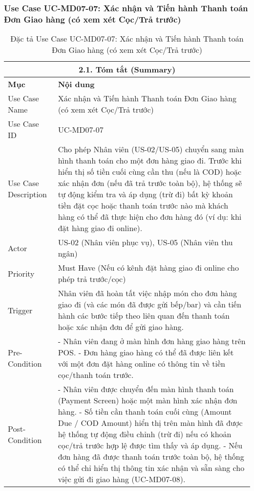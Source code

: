 \subsubsection{Use Case UC-MD07-07: Xác nhận và Tiến hành Thanh toán Đơn Giao hàng (có xem xét Cọc/Trả trước)}
\begin{longtable}{|m{4cm}|p{11cm}|}
\caption{Đặc tả Use Case UC-MD07-07: Xác nhận và Tiến hành Thanh toán Đơn Giao hàng (có xem xét Cọc/Trả trước)} \label{tab:uc_md07_07_final_full} \\
\hline
\multicolumn{2}{|c|}{\textbf{2.1. Tóm tắt (Summary)}} \\
\hline
\textbf{Mục} & \textbf{Nội dung} \\
\hline
\endhead %
\hline
\endfoot %
\hline
\endlastfoot %
Use Case Name & Xác nhận và Tiến hành Thanh toán Đơn Giao hàng (có xem xét Cọc/Trả trước) \\
\hline
Use Case ID & UC-MD07-07 \\
\hline
Use Case Description & Cho phép Nhân viên (US-02/US-05) chuyển sang màn hình thanh toán cho một đơn hàng giao đi. Trước khi hiển thị số tiền cuối cùng cần thu (nếu là COD) hoặc xác nhận đơn (nếu đã trả trước toàn bộ), hệ thống sẽ tự động kiểm tra và áp dụng (trừ đi) bất kỳ khoản tiền đặt cọc hoặc thanh toán trước nào mà khách hàng có thể đã thực hiện cho đơn hàng đó (ví dụ: khi đặt hàng giao đi online). \\
\hline
Actor & US-02 (Nhân viên phục vụ), US-05 (Nhân viên thu ngân) \\
\hline
Priority & Must Have (Nếu có kênh đặt hàng giao đi online cho phép trả trước/cọc) \\
\hline
Trigger & Nhân viên đã hoàn tất việc nhập món cho đơn hàng giao đi (và các món đã được gửi bếp/bar) và cần tiến hành các bước tiếp theo liên quan đến thanh toán hoặc xác nhận đơn để gửi giao hàng. \\
\hline
Pre-Condition & - Nhân viên đang ở màn hình đơn hàng giao hàng trên POS. \newline - Đơn hàng giao hàng có thể đã được liên kết với một đơn đặt hàng online có thông tin về tiền cọc/thanh toán trước. \\
\hline
Post-Condition & - Nhân viên được chuyển đến màn hình thanh toán (Payment Screen) hoặc một màn hình xác nhận đơn hàng. \newline - Số tiền cần thanh toán cuối cùng (Amount Due / COD Amount) hiển thị trên màn hình đã được hệ thống tự động điều chỉnh (trừ đi) nếu có khoản cọc/trả trước hợp lệ được tìm thấy và áp dụng. \newline - Nếu đơn hàng đã được thanh toán trước toàn bộ, hệ thống có thể chỉ hiển thị thông tin xác nhận và sẵn sàng cho việc gửi đi giao hàng (UC-MD07-08). \\

\end{longtable}
